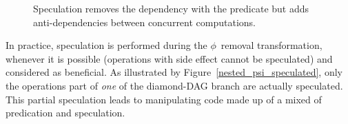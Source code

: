 \begin{figure}[h]
\hfill
{}\hfill
{}\hfill
{}
\caption{\label{fig:pred_versus_spec}Speculation removes the dependency with the predicate but adds anti-dependencies between concurrent computations.}
\end{figure}

In practice, speculation is performed during the $\phi$~removal transformation, whenever it is possible (operations with side effect cannot be speculated) and considered as beneficial. As illustrated by Figure~\ref{nested_psi_speculated}, only the operations part of \emph{one} of the diamond-DAG branch are actually speculated. This partial speculation leads to manipulating code made up of a mixed of predication and speculation. 


